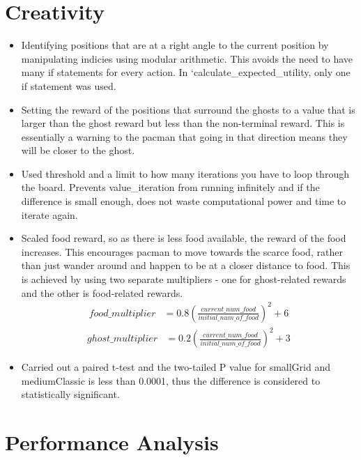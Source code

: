 \documentclass[12pt]{report}
\begin{document}
      \section*{Creativity}
        \begin{itemize}
          \item Identifying positions that are at a right angle to the current position by manipulating indicies using modular arithmetic. This avoids the need to have many if statements for every action. In `calculate\_expected\_utility, only one if statement was used.
          \item Setting the reward of the positions that surround the ghosts to a value that is larger than the ghost reward but less than the non-terminal reward. This is essentially a warning to the pacman that going in that direction means they will be closer to the ghost.
          \item Used threshold and a limit to how many iterations you have to loop through the board. Prevents value\_iteration from running infinitely and if the difference is small enough, does not waste computational power and time to iterate again.
          \item Scaled food reward, so as there is less food available, the reward of the food increases. This encourages pacman to move towards the scarce food, rather than just wander around and happen to be at a closer distance to food. This is achieved by using two separate multipliers - one for ghost-related rewards and the other is food-related rewards.
          \vspace{-2mm}
            \begin{align*}
              food\_multiplier &= 0.8 \left(\frac{current\_num\_food}{initial\_num\_of\_food}\right)^2 + 6
            \end{align*}
            \vspace{-5mm}
            \begin{align*}
              ghost\_multiplier &= 0.2 \left(\frac{current\_num\_food}{initial\_num\_of\_food}\right)^2 + 3
            \end{align*}
          \item Carried out a paired t-test and the two-tailed P value for smallGrid and mediumClassic is less than 0.0001, thus the difference is considered to statistically significant.
        \end{itemize}

      \section*{Performance Analysis}
\end{document}

